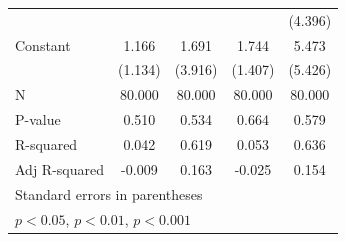 \begin{table}[htbp]
\begin{tabular}{l*{4}{c}}
                    &                     &                     &                     &     (4.396)         \\
[1em]
Constant            &       1.166         &       1.691         &       1.744         &       5.473         \\
                    &     (1.134)         &     (3.916)         &     (1.407)         &     (5.426)         \\
\hline
N                   &      80.000         &      80.000         &      80.000         &      80.000         \\
P-value             &       0.510         &       0.534         &       0.664         &       0.579         \\
R-squared           &       0.042         &       0.619         &       0.053         &       0.636         \\
Adj R-squared       &      -0.009         &       0.163         &      -0.025         &       0.154         \\
\hline\hline
\multicolumn{5}{l}{\footnotesize Standard errors in parentheses}\\
\multicolumn{5}{l}{\footnotesize \sym{*} \(p<0.05\), \sym{**} \(p<0.01\), \sym{***} \(p<0.001\)}\\
\end{tabular}
\end{table}
